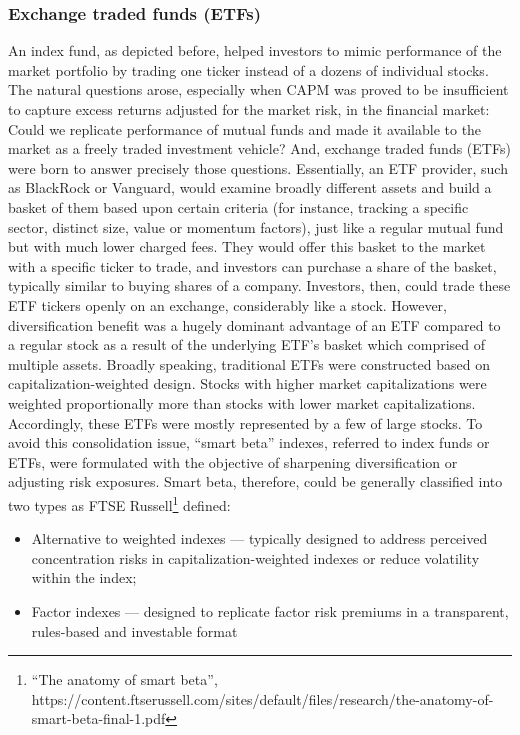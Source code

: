 \subsubsection{Exchange traded funds (ETFs)}
An index fund, as depicted before, helped investors to mimic performance of the market portfolio by trading one ticker instead of a dozens of individual stocks. The natural questions arose, especially when CAPM was proved to be insufficient to capture excess returns adjusted for the market risk, in the financial market: Could we replicate performance of mutual funds and made it available to the market as a freely traded investment vehicle? And, exchange traded funds (ETFs) were born to answer precisely those questions. Essentially, an ETF provider, such as BlackRock or Vanguard, would examine broadly different assets and build a basket of them based upon certain criteria (for instance, tracking a specific sector, distinct size, value or momentum factors), just like a regular mutual fund but with much lower charged fees. They would offer this basket to the market with a specific ticker to trade, and investors can purchase a share of the basket, typically similar to buying shares of a company. Investors, then, could trade these ETF tickers openly on an exchange, considerably like a stock. However, diversification benefit was a hugely dominant advantage of an ETF compared to a regular stock as a result of the underlying ETF’s basket which comprised of multiple assets.
Broadly speaking, traditional ETFs were constructed based on capitalization-weighted design. Stocks with higher market capitalizations were weighted proportionally more than stocks with lower market capitalizations. Accordingly, these ETFs were mostly represented by a few of large stocks. To avoid this consolidation issue, “smart beta” indexes, referred to index funds or ETFs, were formulated with the objective of sharpening diversification or adjusting risk exposures. Smart beta, therefore, could be generally classified into two types as FTSE Russell\footnote{“The anatomy of smart beta”, https://content.ftserussell.com/sites/default/files/research/the-anatomy-of-smart-beta-final-1.pdf}  defined: 
\begin{itemize}
	\item Alternative to weighted indexes — typically designed to address perceived concentration risks in capitalization-weighted indexes or reduce volatility within the index; 
	\item Factor indexes — designed to replicate factor risk premiums in a transparent, rules-based and investable format
\end{itemize}

